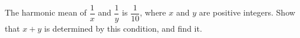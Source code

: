The harmonic mean of $\dfrac{1}{x}$ and $\dfrac{1}{y}$ is $\dfrac{1}{10}$, where $x$ and $y$ are positive integers. Show that $x+y$ is determined by this condition, and find it.
